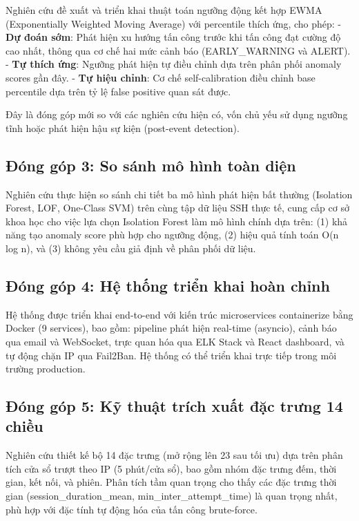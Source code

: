 \documentclass[
  a4paper]{report}
\begin{document}
Nghiên cứu đề xuất và triển khai thuật toán ngưỡng động kết hợp EWMA
(Exponentially Weighted Moving Average) với percentile thích ứng, cho
phép: - \textbf{Dự đoán sớm}: Phát hiện xu hướng tấn công trước khi tấn
công đạt cường độ cao nhất, thông qua cơ chế hai mức cảnh báo
(EARLY\_WARNING và ALERT). - \textbf{Tự thích ứng}: Ngưỡng phát hiện tự
điều chỉnh dựa trên phân phối anomaly scores gần đây. - \textbf{Tự hiệu
chỉnh}: Cơ chế self-calibration điều chỉnh base percentile dựa trên tỷ
lệ false positive quan sát được.

Đây là đóng góp mới so với các nghiên cứu hiện có, vốn chủ yếu sử dụng
ngưỡng tĩnh hoặc phát hiện hậu sự kiện (post-event detection).

\subsection{Đóng góp 3: So sánh mô hình toàn
diện}\label{ux111uxf3ng-guxf3p-3-so-suxe1nh-muxf4-huxecnh-touxe0n-diux1ec7n}

Nghiên cứu thực hiện so sánh chi tiết ba mô hình phát hiện bất thường
(Isolation Forest, LOF, One-Class SVM) trên cùng tập dữ liệu SSH thực
tế, cung cấp cơ sở khoa học cho việc lựa chọn Isolation Forest làm mô
hình chính dựa trên: (1) khả năng tạo anomaly score phù hợp cho ngưỡng
động, (2) hiệu quả tính toán O(n log n), và (3) không yêu cầu giả định
về phân phối dữ liệu.

\subsection{Đóng góp 4: Hệ thống triển khai hoàn
chỉnh}\label{ux111uxf3ng-guxf3p-4-hux1ec7-thux1ed1ng-triux1ec3n-khai-houxe0n-chux1ec9nh}

Hệ thống được triển khai end-to-end với kiến trúc microservices
containerize bằng Docker (9 services), bao gồm: pipeline phát hiện
real-time (asyncio), cảnh báo qua email và WebSocket, trực quan hóa qua
ELK Stack và React dashboard, và tự động chặn IP qua Fail2Ban. Hệ thống
có thể triển khai trực tiếp trong môi trường production.

\subsection{Đóng góp 5: Kỹ thuật trích xuất đặc trưng 14
chiều}\label{ux111uxf3ng-guxf3p-5-kux1ef9-thuux1eadt-truxedch-xuux1ea5t-ux111ux1eb7c-trux1b0ng-14-chiux1ec1u}

Nghiên cứu thiết kế bộ 14 đặc trưng (mở rộng lên 23 sau tối ưu) dựa trên
phân tích cửa sổ trượt theo IP (5 phút/cửa sổ), bao gồm nhóm đặc trưng
đếm, thời gian, kết nối, và phiên. Phân tích tầm quan trọng cho thấy các
đặc trưng thời gian (session\_duration\_mean, min\_inter\_attempt\_time)
là quan trọng nhất, phù hợp với đặc tính tự động hóa của tấn công
brute-force.
\end{document}
